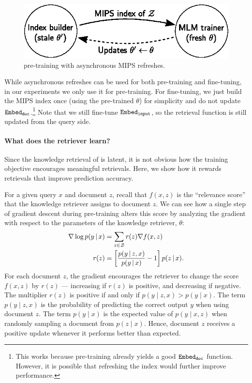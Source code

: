 \documentclass{article}
\begin{document}
{
\begin{figure}
\begin{center}
\includegraphics[width=.8\columnwidth]{figures/trainer_generator.eps}
\caption{\thename pre-training with asynchronous MIPS refreshes.}
\end{center}
\end{figure}
}

While asynchronous refreshes can be used for both pre-training and fine-tuning, in our experiments we only use it for pre-training. For fine-tuning, we just build the MIPS index once (using the pre-trained $\theta$) for simplicity and do not update $\mathtt{Embed_{doc}}$.\footnote{This works because pre-training already yields a good $\mathtt{Embed_{doc}}$ function. However, it is possible that refreshing the index would further improve performance.} Note that we still fine-tune $\mathtt{Embed_{input}}$, so the retrieval function is still updated from the query side.

\paragraph{What does the retriever learn?}
Since the knowledge retrieval of \thename is latent, it is not obvious how the training objective encourages meaningful retrievals. Here, we show how it rewards retrievals that improve prediction accuracy.

For a given query $x$ and document $z$, recall that $f(x,z)$
is the ``relevance score'' that the knowledge retriever assigns to document $z$.
We can see how a single step of gradient descent during \thename pre-training alters this score by analyzing
the gradient with respect to the parameters of the knowledge retriever, $\theta$:
\begin{align*}
\nabla \log p(y \,|\, x) & =\sum_{z\in\mathcal{Z}} r(z) \nabla f(x,z) \\
r(z) & =\left[\frac{p(y \,|\, z,x)}{p(y \,|\, x)}-1\right]p(z \,|\, x).
\end{align*}
For each document $z$, the gradient encourages
the retriever to change the score $f(x,z)$ by $r(z)$ --- 
increasing if $r(z)$ is positive, and decreasing if negative.
The multiplier $r(z)$
is positive if and only if $p(y\mid z,x) > p(y\mid x)$.
The term $p(y\mid z,x)$ is the probability of predicting
the correct output $y$ when using document $z$.
The term $p(y \mid x)$ is the expected value of $p(y \mid x, z)$ when randomly sampling a document from $p(z \mid x)$. Hence, document $z$ receives a positive update whenever it performs better than expected.
\end{document}
